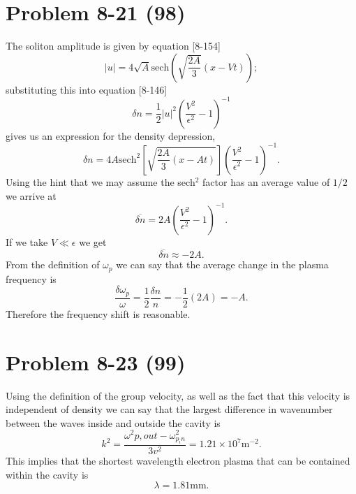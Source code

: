 \section*{Problem 8-21 (98)}
\label{sec:8-21}
The soliton amplitude is given by equation [8-154]
\begin{equation*}
	|u| = 4\sqrt{A}\text{sech}(\sqrt{\dfrac{2A}{3}}(x-Vt));
\end{equation*}
substituting this into equation [8-146]
\begin{equation*}
	\delta n = \dfrac{1}{2}|u|^2\left(\dfrac{V^2}{\epsilon^2} - 1\right)^{-1}
\end{equation*}
gives us an expression for the density depression,
\begin{equation*}
	\delta n = 4A\text{sech}^2\left[\sqrt{\dfrac{2A}{3}(x - At)} \right]\left(\dfrac{V^2}{\epsilon^2} - 1\right)^{-1}.
\end{equation*}
Using the hint that we may assume the sech\(^2\) factor has an average value of \(1/2\) we arrive at
\begin{equation*}
	\overline{\delta n} = 2A\left(\dfrac{V^2}{\epsilon^2} - 1\right)^{-1}.
\end{equation*}
If we take \(V \ll \epsilon \) we get
\begin{equation*}
	\overline{\delta n} \approx -2A.
\end{equation*}
From the definition of \(\omega_p \) we can say that the average change in the plasma frequency is
\begin{equation*}
	\dfrac{\delta \omega_p}{\omega} = \dfrac{1}{2}\dfrac{\delta n}{n}  = -\dfrac{1}{2} (2A) = -A.
\end{equation*}
Therefore the frequency shift is reasonable. 

\section*{Problem 8-23 (99)}
\label{sec:8-23}
Using the definition of the group velocity, as well as the fact that this velocity is independent of density we can say that the largest difference in wavenumber between the waves inside and outside the cavity is
\begin{equation*}
	k^2 = \dfrac{\omega^2{p,out} - \omega^2_{p_in}}{3v^2} = 1.21\times 10^{7}\text{m}^{-2}.
\end{equation*}
This implies that the shortest wavelength electron plasma that can be contained within the cavity is
\begin{equation*}
	\lambda = 1.81\text{mm}.
\end{equation*}


